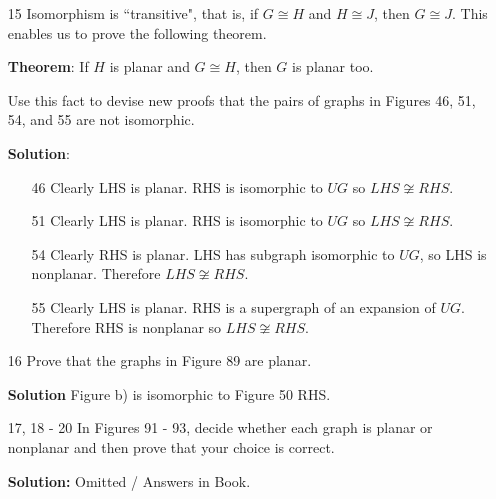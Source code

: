 \documentclass{article}
\begin{document}
\begin{enumerate}
	\item[15] Isomorphism is ``transitive", that is, if $G \cong H$ and $H \cong J$, then $G \cong J$. This enables us to prove the following theorem.
	
	\textbf{Theorem}: If $H$ is planar and $G \cong H$, then $G$ is planar too.
	
	Use this fact to devise new proofs that the pairs of graphs in Figures 46, 51, 54, and 55 are not isomorphic.
	
	\textbf{Solution}:
		\begin{enumerate}
			\item[46] Clearly LHS is planar. RHS is isomorphic to $UG$ so $LHS \not\cong RHS$.
			\item[51] Clearly LHS is planar. RHS is isomorphic to $UG$ so $LHS \not\cong RHS$.
			\item[54] Clearly RHS is planar. LHS has subgraph isomorphic to $UG$, so LHS is nonplanar. Therefore $LHS \not\cong RHS$.
			\item[55] Clearly LHS is planar. RHS is a supergraph of an expansion of $UG$. Therefore RHS is nonplanar so $LHS \not\cong RHS$.
		\end{enumerate}
		
	\item[16] Prove that the graphs in Figure 89 are planar.
	
	\textbf{Solution} Figure b) is isomorphic to Figure 50 RHS.
	
	\item[17, 18 - 20] In Figures 91 - 93, decide whether each graph is planar or nonplanar and then prove that your choice is correct.
	
	\textbf{Solution:} Omitted / Answers in Book.
\end{enumerate}
\end{document}
